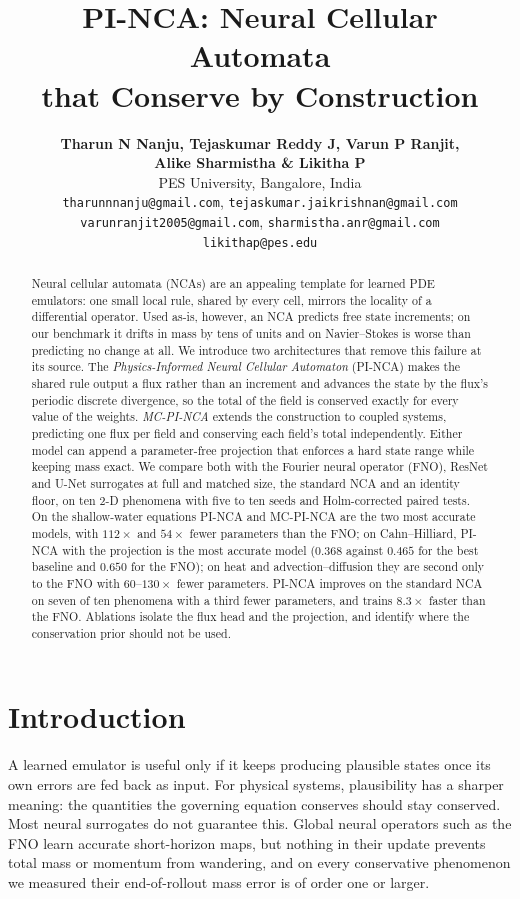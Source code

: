 \documentclass{article}
\title{PI-NCA: Neural Cellular Automata\\that Conserve by Construction}
\author{\textbf{Tharun N Nanju, Tejaskumar Reddy J, Varun P Ranjit,}\\
\textbf{Alike Sharmistha \& Likitha P}\\
\normalfont PES University, Bangalore, India\\
\normalfont\small\texttt{tharunnnanju@gmail.com},
\texttt{tejaskumar.jaikrishnan@gmail.com}\\
\normalfont\small\texttt{varunranjit2005@gmail.com},
\texttt{sharmistha.anr@gmail.com}\\
\normalfont\small\texttt{likithap@pes.edu}}
\date{}
\begin{document}
\maketitle
\pagestyle{plain}

\begin{abstract}
Neural cellular automata (NCAs) are an appealing template for learned PDE emulators: one
small local rule, shared by every cell, mirrors the locality of a differential operator.
Used as-is, however, an NCA predicts free state increments; on our benchmark it drifts in
mass by tens of units and on Navier--Stokes is worse than predicting no change at all. We
introduce two architectures that remove this failure at its source. The
\emph{Physics-Informed Neural Cellular Automaton} (PI-NCA) makes the shared rule output a
flux rather than an increment and advances the state by the flux's periodic discrete
divergence, so the total of the field is conserved exactly for every value of the
weights. \emph{MC-PI-NCA} extends the construction to coupled systems, predicting one flux
per field and conserving each field's total independently. Either model can append a
parameter-free projection that enforces a hard state range while keeping mass exact. We
compare both with the Fourier neural operator (FNO), ResNet and U-Net surrogates at full
and matched size, the standard NCA and an identity floor, on ten 2-D phenomena with five
to ten seeds and Holm-corrected paired tests. On the shallow-water equations PI-NCA and
MC-PI-NCA are the two most accurate models, with $112\times$ and $54\times$ fewer
parameters than the FNO; on Cahn--Hilliard, PI-NCA with the projection is the most
accurate model ($0.368$ against $0.465$ for the best baseline and $0.650$ for the FNO);
on heat and advection--diffusion they are second only to the FNO with $60$--$130\times$
fewer parameters. PI-NCA improves on the standard NCA on seven of ten phenomena with a
third fewer parameters, and trains $8.3\times$ faster than the FNO. Ablations isolate the
flux head and the projection, and identify where the conservation prior should not be
used.
\end{abstract}

\section{Introduction}
\label{sec:intro}
A learned emulator is useful only if it keeps producing plausible states once its own
errors are fed back as input. For physical systems, plausibility has a sharper meaning:
the quantities the governing equation conserves should stay conserved. Most neural
surrogates do not guarantee this. Global neural operators such as the FNO
\citep{li2020fno} learn accurate short-horizon maps, but nothing in their update prevents
total mass or momentum from wandering, and on every conservative phenomenon we measured
their end-of-rollout mass error is of order one or larger.
\end{document}
